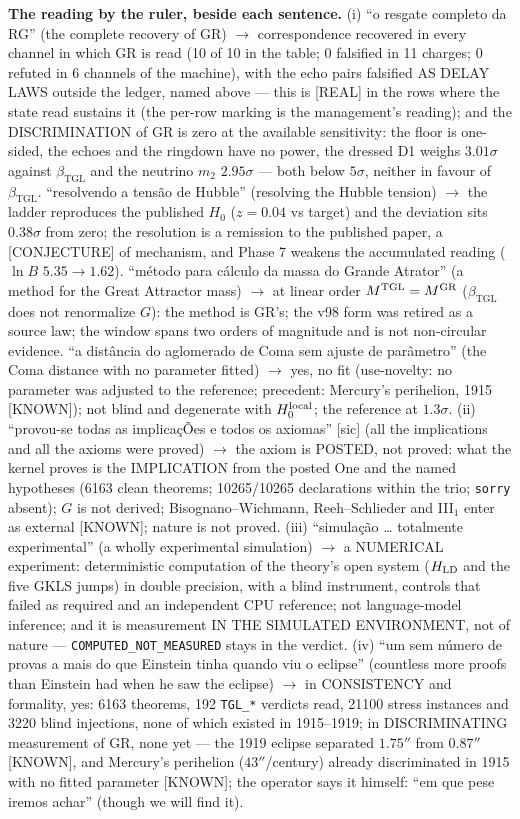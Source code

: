 \documentclass[11pt]{article}
\newcommand{\bTGL}{\beta_{\mathrm{TGL}}}\newcommand{\Msun}{M_{\odot}}\newcommand{\TGL}{\mathrm{TGL}}
\theoremstyle{definition}\newtheorem{deriv}{Derivation}
\begin{document}
\textbf{The reading by the ruler, beside each sentence.} (i) ``o resgate completo da RG'' (the complete recovery of GR) $\to$ correspondence recovered in every channel in which GR is read (10 of 10 in the table; 0 falsified in 11 charges; 0 refuted in 6 channels of the machine), with the echo pairs falsified AS DELAY LAWS outside the ledger, named above --- this is \textsf{[REAL]} in the rows where the state read sustains it (the per-row marking is the management's reading); and the DISCRIMINATION of GR is zero at the available sensitivity: the floor is one-sided, the echoes and the ringdown have no power, the dressed D1 weighs $3.01\sigma$ against $\bTGL$ and the neutrino $m_2$ $2.95\sigma$ --- both below $5\sigma$, neither in favour of $\bTGL$. ``resolvendo a tensão de Hubble'' (resolving the Hubble tension) $\to$ the ladder reproduces the published $H_0$ ($z=0.04$ vs target) and the deviation sits $0.38\sigma$ from zero; the resolution is a remission to the published paper, a \textsf{[CONJECTURE]} of mechanism, and Phase 7 weakens the accumulated reading ($\ln B$ $5.35\to1.62$). ``método para cálculo da massa do Grande Atrator'' (a method for the Great Attractor mass) $\to$ at linear order $M^{\rm TGL}=M^{\rm GR}$ ($\bTGL$ does not renormalize $G$): the method is GR's; the v98 form was retired as a source law; the window spans two orders of magnitude and is not non-circular evidence. ``a distância do aglomerado de Coma sem ajuste de parâmetro'' (the Coma distance with no parameter fitted) $\to$ yes, no fit (use-novelty: no parameter was adjusted to the reference; precedent: Mercury's perihelion, 1915 \textsf{[KNOWN]}); not blind and degenerate with $H_0^{\rm local}$; the reference at $1.3\sigma$. (ii) ``provou-se todas as implicaçÕes e todos os axiomas'' [sic] (all the implications and all the axioms were proved) $\to$ the axiom is POSTED, not proved: what the kernel proves is the IMPLICATION from the posted One and the named hypotheses (6163 clean theorems; 10265/10265 declarations within the trio; \texttt{sorry} absent); $G$ is not derived; Bisognano--Wichmann, Reeh--Schlieder and III$_1$ enter as external \textsf{[KNOWN]}; nature is not proved. (iii) ``simulação … totalmente experimental'' (a wholly experimental simulation) $\to$ a NUMERICAL experiment: deterministic computation of the theory's open system ($H_{\rm LD}$ and the five GKLS jumps) in double precision, with a blind instrument, controls that failed as required and an independent CPU reference; not language-model inference; and it is measurement IN THE SIMULATED ENVIRONMENT, not of nature --- \texttt{COMPUTED\_NOT\_MEASURED} stays in the verdict. (iv) ``um sem número de provas a mais do que Einstein tinha quando viu o eclipse'' (countless more proofs than Einstein had when he saw the eclipse) $\to$ in CONSISTENCY and formality, yes: 6163 theorems, 192 \texttt{TGL\_*} verdicts read, 21100 stress instances and 3220 blind injections, none of which existed in 1915--1919; in DISCRIMINATING measurement of GR, none yet --- the 1919 eclipse separated $1.75''$ from $0.87''$ \textsf{[KNOWN]}, and Mercury's perihelion ($43''$/century) already discriminated in 1915 with no fitted parameter \textsf{[KNOWN]}; the operator says it himself: ``em que pese iremos achar'' (though we will find it).
\end{document}
